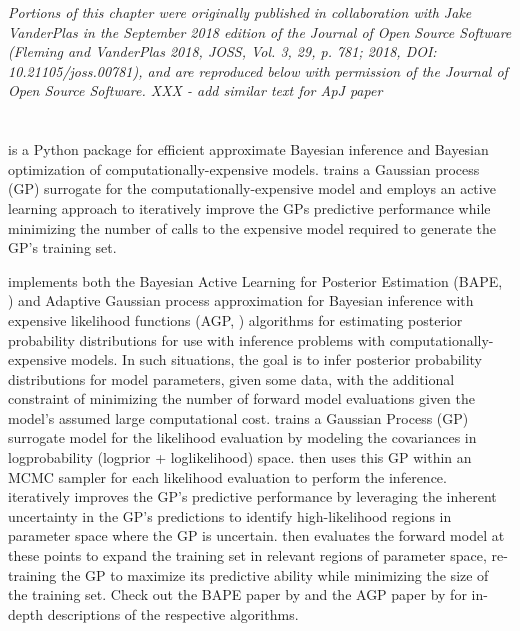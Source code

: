 \textit{Portions of this chapter were originally published in collaboration with Jake VanderPlas in the September 2018 edition of the Journal of Open Source Software (Fleming and VanderPlas 2018, JOSS, Vol. 3, 29, p. 781; 2018, DOI: 10.21105/joss.00781), and are reproduced below with permission of the Journal of Open Source Software. XXX - add similar text for ApJ paper}

\section{\approxposterior}

\approxposterior is a Python package for efficient approximate Bayesian inference and Bayesian optimization of computationally-expensive models. \approxposterior trains a Gaussian process (GP) surrogate for the computationally-expensive model and employs an active learning approach to iteratively improve the GPs predictive performance while minimizing the number of calls to the expensive model required to generate the GP's training set.

\approxposterior implements both the Bayesian Active Learning for Posterior Estimation (BAPE, \citet{Kandasamy2017}) and Adaptive Gaussian process approximation for Bayesian inference with expensive likelihood functions (AGP, \citet{Wang2018}) algorithms for estimating posterior probability distributions for use with inference problems with computationally-expensive models. In such situations, the goal is to infer posterior probability distributions for model parameters, given some data, with the additional constraint of minimizing the number of forward model evaluations given the model's assumed large computational cost. \approxposterior trains a Gaussian Process (GP) surrogate model for the likelihood evaluation by modeling the covariances in logprobability (logprior + loglikelihood) space. \approxposterior then uses this GP within an MCMC sampler for each likelihood evaluation to perform the inference. \approxposterior iteratively improves the GP's predictive performance by leveraging the inherent uncertainty in the GP's predictions to identify high-likelihood regions in parameter space where the GP is uncertain. \approxposterior then evaluates the forward model at these points to expand the training set in relevant regions of parameter space, re-training the GP to maximize its predictive ability while minimizing the size of the training set. Check out the BAPE paper by \citet{Kandasamy2017} and the AGP paper by \citet{Wang2018} for in-depth descriptions of the respective algorithms.


